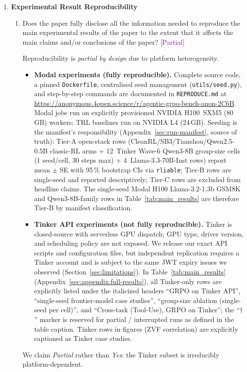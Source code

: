 \documentclass{article}
\newcommand{\answerPartial}[1][]{\textcolor{purple}{[Partial] #1}}
\begin{document}
\begin{enumerate}
\item {\bf Experimental Result Reproducibility}
    \begin{enumerate}
    \item Does the paper fully disclose all the information needed to
          reproduce the main experimental results of the paper to the
          extent that it affects the main claims and/or conclusions of
          the paper?
    \answerPartial{Reproducibility is \emph{partial by design} due to
    platform heterogeneity.
    \begin{itemize}
      \item \textbf{Modal experiments (fully reproducible).} Complete
            source code, a pinned \texttt{Dockerfile}, centralised seed
            management (\texttt{utils/seed.py}), and step-by-step
            commands are documented in \texttt{REPRODUCE.md} at
            \url{https://anonymous.4open.science/r/agentic-grpo-bench-anon-2C6B}.  Modal
            jobs run on explicitly provisioned NVIDIA H100~SXM5 (80\,GB)
            workers; TRL baselines run on NVIDIA L4 (24\,GB).  Seeding is
            the manifest's responsibility (Appendix~\ref{sec:run-manifest},
            source of truth): Tier-A open-stack rows
            (CleanRL/SB3/Tianshou/Qwen2.5-0.5B classic-RL arms +
            12~Tinker Wave-6 Qwen3-8B group-size cells (1 seed/cell,
            30 steps max) + 4~Llama-3.3-70B-Inst rows) report
            mean $\pm$ SE with 95\,\% bootstrap CIs via
            \texttt{rliable}; Tier-B rows are single-seed and reported
            descriptively; Tier-C rows are excluded from headline
            claims. The single-seed Modal H100 Llama-3.2-{1,3}b GSM8K
            and Qwen3-8B-family rows in Table~\ref{tab:main_results} are
            therefore Tier-B by manifest classification.
      \item \textbf{Tinker API experiments (not fully reproducible).}
            Tinker is closed-source with serverless GPU dispatch; GPU
            type, driver version, and scheduling policy are not exposed.
            We release our exact API scripts and configuration files, but
            independent replication requires a Tinker account and is
            subject to the same JWT expiry issues we observed
            (Section~\ref{sec:limitations}).  In
            Table~\ref{tab:main_results} (Appendix~\ref{sec:appendix:full-results}),
            all Tinker-only rows are explicitly listed under the
            italicized headers ``GRPO on Tinker API'', ``single-seed
            frontier-model case studies'', ``group-size ablation
            (single-seed per cell)'', and ``Cross-task (Tool-Use), GRPO
            on Tinker''; the ``$\dagger$'' marker is reserved for
            partial / interrupted runs as defined in the table caption.
            Tinker rows in figures (ZVF correlation) are explicitly
            captioned as Tinker case studies.
    \end{itemize}
    We claim \emph{Partial} rather than \emph{Yes}: the Tinker subset is
    irreducibly platform-dependent.}
    \end{enumerate}


\end{enumerate}
\end{document}
